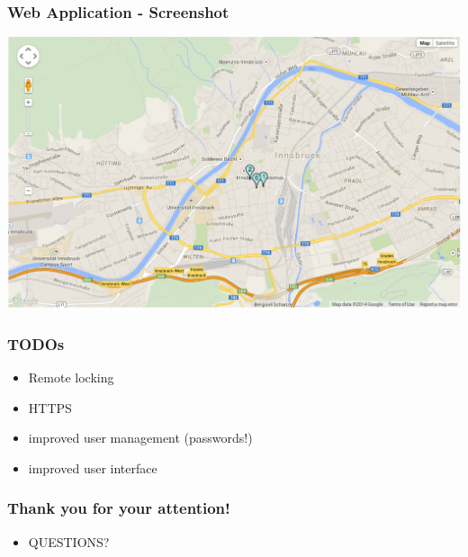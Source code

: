 \documentclass[darktitle]{beamer}
\begin{document}
	\begin{frame}
		\frametitle{Web Application - Screenshot}
		\begin{center}
		\includegraphics[height=0.75\textheight]{figures/webApp_screenshot.pdf}
		\end{center}
	\end{frame}

	\begin{frame}
		\frametitle{TODOs}
		\begin{itemize}
			\item Remote locking
			\item HTTPS
			\item improved user management (passwords!)
			\item improved user interface
		\end{itemize}
	\end{frame}

	\begin{frame}
		\frametitle{Thank you for your attention!}
		\begin{itemize}
			\item[] \huge{QUESTIONS?}
		\end{itemize}
	\end{frame}

	
\end{document}
